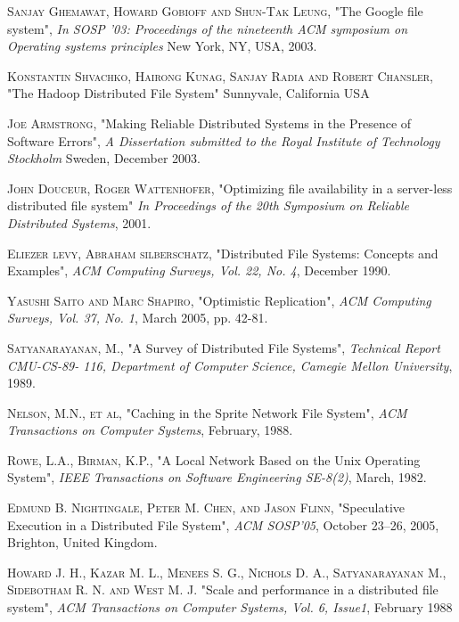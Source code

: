 \documentclass[a4paper,12pt]{article}
\begin{document}
\begin{thebibliography}{99}
  \textsc{Sanjay Ghemawat, Howard Gobioff and Shun-Tak Leung},
  "The Google file system",
  \emph{In SOSP '03: Proceedings of the nineteenth ACM symposium on Operating systems principles}
  New York, NY, USA, 2003.

  \textsc{Konstantin Shvachko, Hairong Kunag, Sanjay Radia and Robert Chansler},
  "The Hadoop Distributed File System"
  Sunnyvale, California USA

  \textsc{Joe Armstrong},
  "Making Reliable Distributed Systems in the Presence of Software Errors",
  \emph{A Dissertation submitted to the Royal Institute of Technology Stockholm}
  Sweden, December 2003.

  \textsc{John Douceur, Roger Wattenhofer},
  "Optimizing file availability in a server-less distributed file system"
  \emph{In Proceedings of the 20th Symposium on Reliable Distributed Systems},
  2001.

  \textsc{Eliezer levy, Abraham silberschatz},
  "Distributed File Systems: Concepts and Examples",
  \emph{ACM Computing Surveys, Vol. 22, No. 4},
  December 1990.

  \textsc{Yasushi Saito and Marc Shapiro},
  "Optimistic Replication",
  \emph{ACM Computing Surveys, Vol. 37, No. 1},
  March 2005, pp. 42-81.

  \textsc{Satyanarayanan, M.},
  "A Survey of Distributed File Systems",
  \emph{Technical Report CMU-CS-89- 116, Department of Computer Science, Camegie Mellon University},
  1989.

  \textsc{Nelson, M.N., et al},
  "Caching in the Sprite Network File System",
  \emph{ACM Transactions on Computer Systems},
  February, 1988.

  \textsc{Rowe, L.A., Birman, K.P.},
  "A Local Network Based on the Unix Operating System",
  \emph{IEEE Transactions on Software Engineering SE-8(2)},
  March, 1982.

  \textsc{Edmund B. Nightingale, Peter M. Chen, and Jason
Flinn},
  "Speculative Execution in a Distributed File System",
  \emph{ACM SOSP’05},
  October 23–26, 2005, Brighton, United Kingdom.

  \textsc{Howard J. H., Kazar M. L., Menees S. G., Nichols D. A.,
Satyanarayanan M., Sidebotham R. N. and West M. J.}
  "Scale and performance in a distributed file system",
  \emph{ACM Transactions on Computer Systems, Vol. 6, Issue1},
  February 1988


\end{thebibliography}
\end{document}
